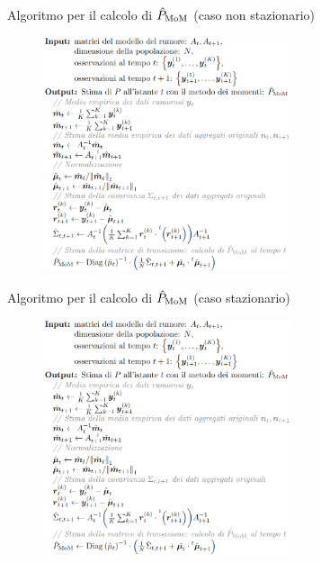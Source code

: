 \documentclass[10pt,xcolor={table,dvipsnames}]{beamer} 		%
\theoremstyle{plain}					%
\theoremstyle{definition}
\theoremstyle{remark}
\begin{document}
	\begin{frame}[fragile]
		{Algoritmo per il calcolo di $\hat{P}_{\textup{MoM}}$ {\smaller (caso non stazionario)}}

		\begin{figure}[ht]
			\centering
			\includegraphics[width=0.65\textwidth]{Immagini/algorithm_nonstationary.png}
		\end{figure}
		
	\end{frame}

	\begin{frame}[fragile]
		{Algoritmo per il calcolo di $\hat{P}_{\textup{MoM}}$ {\smaller (caso stazionario)}}

		\begin{figure}[ht]
			\centering
			\includegraphics[width=0.65\textwidth]{Immagini/algorithm_nonstationary.png}
		\end{figure}
		
	\end{frame}
\end{document}
